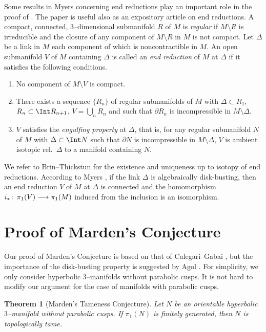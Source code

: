 \documentclass{gtart_a}
\newtheorem{theorem}{Theorem}[section]
\theoremstyle{definition}
\numberwithin{equation}{section}
\begin{document}
Some results in Myers \cite{my} concerning end reductions play an important role in the proof of .
The paper is useful also as an expository article on end reductions.
A compact, connected, $3$--dimensional submanifold $R$ of $M$ is \emph{regular\/} if $M\setminus R$ is irreducible and 
the closure of any component of $M\setminus R$ in $M$ is not compact.
Let $\Delta$ be a link in $M$ each component of which is noncontractible in $M$.
An open submanifold $V$ of $M$ containing $\Delta$ is called an \emph{end reduction\/} of $M$ at $\Delta$ if it 
satisfies the following conditions.
\begin{enumerate}[\rm (i)]
\item
No component of $M\setminus V$ is compact.
\item
There exists a sequence $\{R_n\}$ of regular submanifolds of $M$ with $\Delta\subset R_1$, $R_n\subset 
\Int R_{n+1}$, $V=\bigcup_n R_n$ and such that $\partial R_n$ is incompressible in $M\setminus \Delta$.
\item
$V$ satisfies the \emph{engulfing property\/} at $\Delta$, that is, for any regular submanifold $N$ of $M$ with 
$\Delta \subset \Int N$ such that $\partial N$ is incompressible in $M\setminus \Delta$, $V$ is ambient 
isotopic rel.\ $\Delta$ to a manifold containing $N$.
\end{enumerate}
We refer to Brin--Thickstun \cite{bt} for the existence and uniqueness up to isotopy of end reductions.
According to Myers \cite[Theorem 9.2]{my}, if the link $\Delta$ is algebraically disk-busting, then an end 
reduction $V$ of $M$ at $\Delta$ is connected and the homomorphism $i_*\mskip0.5mu\colon\thinspace \pi_1(V)\longrightarrow \pi_1(M)$ 
induced from the inclusion is an isomorphism.







\section{Proof of Marden's Conjecture}\label{S4}


Our proof of Marden's Conjecture is based on that of Calegari--Gabai \cite{cg}, but the importance of the 
disk-busting property is suggested by Agol \cite{ag}.
For simplicity, we only consider hyperbolic $3$--manifolds without parabolic cusps.
It is not hard to modify our argument for the case of manifolds with parabolic cusps.




\begin{theorem}[Marden's Tameness Conjecture]\label{t_2}
Let $N$ be an orientable hyperbolic $3$--manifold without parabolic cusps.
If $\pi_1(N)$ is finitely generated, then $N$ is topologically tame.
\end{theorem}
\end{document}
